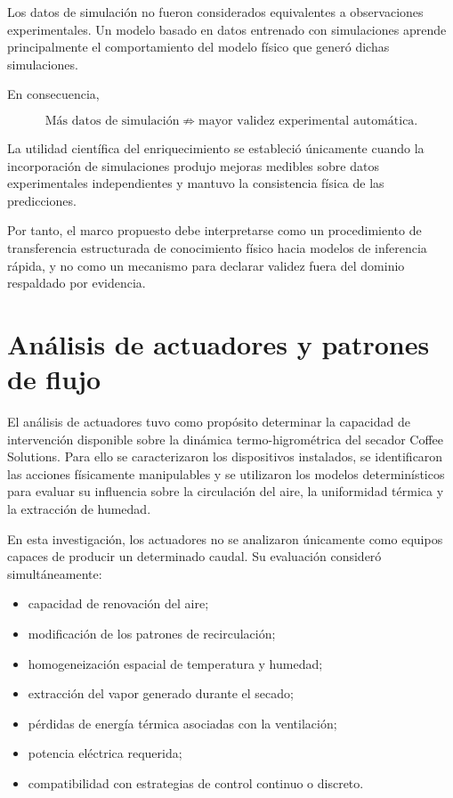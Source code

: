 Los datos de simulación no fueron considerados equivalentes a observaciones experimentales. Un modelo basado en datos entrenado con simulaciones aprende principalmente el comportamiento del modelo físico que generó dichas simulaciones.

En consecuencia,

\begin{equation}
\boxed{
\text{Más datos de simulación}
\not\Rightarrow
\text{mayor validez experimental automática}.
}
\end{equation}

La utilidad científica del enriquecimiento se estableció únicamente cuando la incorporación de simulaciones produjo mejoras medibles sobre datos experimentales independientes y mantuvo la consistencia física de las predicciones.

Por tanto, el marco propuesto debe interpretarse como un procedimiento de transferencia estructurada de conocimiento físico hacia modelos de inferencia rápida, y no como un mecanismo para declarar validez fuera del dominio respaldado por evidencia.

\section{Análisis de actuadores y patrones de flujo}
\label{sec:analisis_actuadores}

El análisis de actuadores tuvo como propósito determinar la capacidad de intervención disponible sobre la dinámica termo-higrométrica del secador Coffee Solutions. Para ello se caracterizaron los dispositivos instalados, se identificaron las acciones físicamente manipulables y se utilizaron los modelos determinísticos para evaluar su influencia sobre la circulación del aire, la uniformidad térmica y la extracción de humedad.

En esta investigación, los actuadores no se analizaron únicamente como equipos capaces de producir un determinado caudal. Su evaluación consideró simultáneamente:

\begin{itemize}
    \item capacidad de renovación del aire;
    \item modificación de los patrones de recirculación;
    \item homogeneización espacial de temperatura y humedad;
    \item extracción del vapor generado durante el secado;
    \item pérdidas de energía térmica asociadas con la ventilación;
    \item potencia eléctrica requerida;
    \item compatibilidad con estrategias de control continuo o discreto.
\end{itemize}

